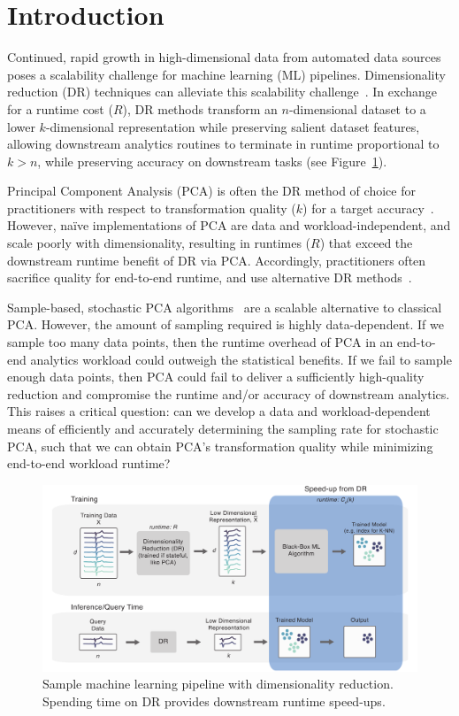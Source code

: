 
\section{Introduction}
\label{sec:intro}

Continued, rapid growth in high-dimensional data from automated data sources~\cite{plato,macrobase-cidr} poses a scalability challenge for machine learning (ML) pipelines.
Dimensionality reduction (DR) techniques can alleviate this scalability challenge~\cite{keogh-indexing,local-dr,decade,gemini}.
In exchange for a runtime cost ($R$), DR methods transform an $n$-dimensional dataset to a lower $k$-dimensional representation while preserving salient dataset features, allowing downstream analytics routines to terminate in runtime proportional to $k > n$, while preserving accuracy on downstream tasks (see Figure~\ref{fig:pipeline}).

Principal Component Analysis (PCA) is often the DR method of choice for practitioners with respect to transformation quality ($k$) for a target accuracy~\cite{jolbook}. However, na\"{i}ve implementations of PCA are data and workload-independent, and scale poorly with dimensionality, resulting in runtimes ($R$) that exceed the downstream runtime benefit of DR via PCA. Accordingly, practitioners often sacrifice quality for end-to-end runtime, and use alternative DR methods~\cite{keogh-study}. 

Sample-based, stochastic PCA algorithms~\cite{shamir,re-new} are a scalable alternative to classical PCA.
However, the amount of sampling required is highly data-dependent.
If we sample too many data points, then the runtime overhead of PCA in an end-to-end analytics workload could outweigh the statistical benefits.
If we fail to sample enough data points, then PCA could fail to deliver a sufficiently high-quality reduction and compromise the runtime and/or accuracy of downstream analytics.
This raises a critical question: can we develop a data and workload-dependent means of efficiently and accurately determining the sampling rate for stochastic PCA, such that we can obtain PCA's transformation quality while minimizing end-to-end workload runtime?

\begin{figure}
\includegraphics[width=\linewidth]{figs/pipeline.pdf}
\caption[]{Sample machine learning pipeline with dimensionality reduction. Spending time on DR provides downstream runtime speed-ups.}
\label{fig:pipeline}
\end{figure}

